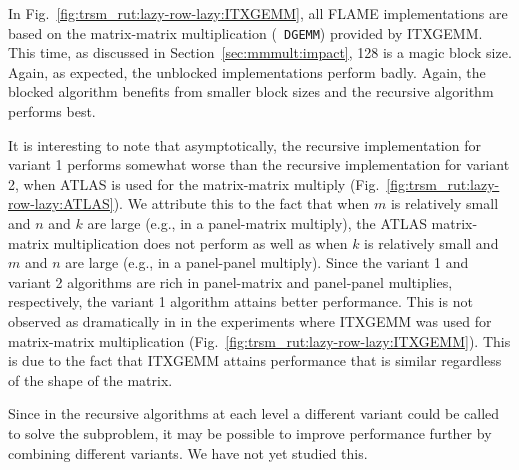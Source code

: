In Fig.~\ref{fig:trsm_rut:lazy-row-lazy:ITXGEMM}, all FLAME
implementations are based on the matrix-matrix multiplication ({\tt
DGEMM}) provided by ITXGEMM.  This time, as discussed in
Section~\ref{sec:mmmult:impact}, 128 is a magic block size.  Again, as
expected, the unblocked implementations perform badly.  Again, the
blocked algorithm benefits from smaller block sizes and the recursive
algorithm performs best.  


It is interesting to note that asymptotically, the recursive implementation
for variant 1 performs somewhat worse than the recursive implementation for
variant 2, when ATLAS is used for the matrix-matrix multiply
(Fig.~\ref{fig:trsm_rut:lazy-row-lazy:ATLAS}).  We attribute this to
the fact that when $ m $ is relatively small and $ n $ and $ k $ are
large (e.g., in a panel-matrix multiply), the ATLAS matrix-matrix
multiplication does not perform as well as when $ k $ is relatively
small and $ m $ and $ n $ are large (e.g., in a panel-panel multiply).
Since the variant 1 and variant 2 algorithms are rich in panel-matrix and
panel-panel multiplies, respectively, the variant 1 algorithm attains
better performance.  This is not observed as dramatically in in the
experiments where ITXGEMM was used for matrix-matrix multiplication
(Fig.~\ref{fig:trsm_rut:lazy-row-lazy:ITXGEMM}).  This is due to the
fact that ITXGEMM attains performance that is similar regardless of
the shape of the matrix.


Since in the recursive algorithms at each level a different variant
could be called to solve the subproblem, it may be possible to improve
performance further by combining different variants.  We have not yet
studied this.


